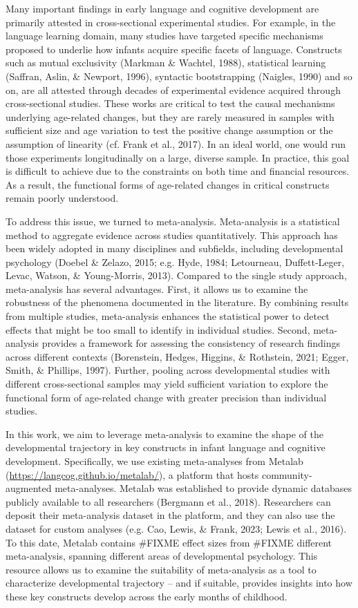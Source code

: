\documentclass[
  man]{apa6}
\begin{document}
Many important findings in early language and cognitive development are primarily attested in cross-sectional experimental studies. For example, in the language learning domain, many studies have targeted specific mechanisms proposed to underlie how infants acquire specific facets of language. Constructs such as mutual exclusivity (Markman \& Wachtel, 1988), statistical learning (Saffran, Aslin, \& Newport, 1996), syntactic bootstrapping (Naigles, 1990) and so on, are all attested through decades of experimental evidence acquired through cross-sectional studies. These works are critical to test the causal mechanisms underlying age-related changes, but they are rarely measured in samples with sufficient size and age variation to test the positive change assumption or the assumption of linearity (cf. Frank et al., 2017). In an ideal world, one would run those experiments longitudinally on a large, diverse sample. In practice, this goal is difficult to achieve due to the constraints on both time and financial resources. As a result, the functional forms of age-related changes in critical constructs remain poorly understood.

To address this issue, we turned to meta-analysis. Meta-analysis is a statistical method to aggregate evidence across studies quantitatively. This approach has been widely adopted in many disciplines and subfields, including developmental psychology (Doebel \& Zelazo, 2015; e.g. Hyde, 1984; Letourneau, Duffett-Leger, Levac, Watson, \& Young-Morris, 2013). Compared to the single study approach, meta-analysis has several advantages. First, it allows us to examine the robustness of the phenomena documented in the literature. By combining results from multiple studies, meta-analysis enhances the statistical power to detect effects that might be too small to identify in individual studies. Second, meta-analysis provides a framework for assessing the consistency of research findings across different contexts (Borenstein, Hedges, Higgins, \& Rothstein, 2021; Egger, Smith, \& Phillips, 1997). Further, pooling across developmental studies with different cross-sectional samples may yield sufficient variation to explore the functional form of age-related change with greater precision than individual studies.

In this work, we aim to leverage meta-analysis to examine the shape of the developmental trajectory in key constructs in infant language and cognitive development. Specifically, we use existing meta-analyses from Metalab (\url{https://langcog.github.io/metalab/}), a platform that hosts community-augmented meta-analyses. Metalab was established to provide dynamic databases publicly available to all researchers (Bergmann et al., 2018). Researchers can deposit their meta-analysis dataset in the platform, and they can also use the dataset for custom analyses (e.g. Cao, Lewis, \& Frank, 2023; Lewis et al., 2016). To this date, Metalab contains \#FIXME effect sizes from \#FIXME different meta-analysis, spanning different areas of developmental psychology. This resource allows us to examine the suitability of meta-analysis as a tool to characterize developmental trajectory -- and if suitable, provides insights into how these key constructs develop across the early months of childhood.
\end{document}
